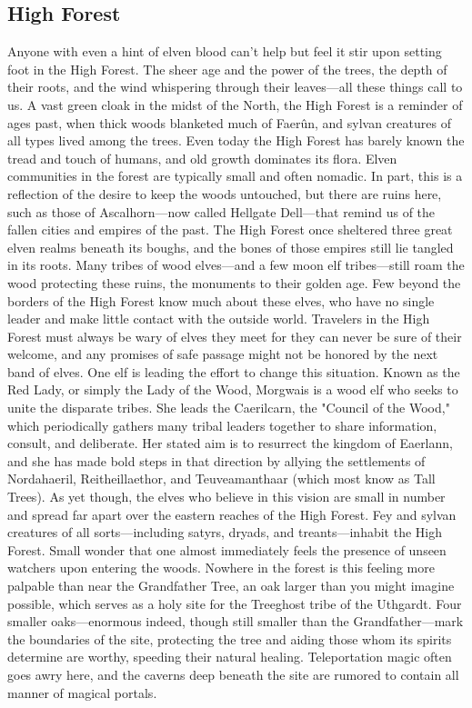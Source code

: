 \documentclass[10pt,a4paper,twoside,twocolumn,openany,bg=print,nodeprecatedcode]{dndbook}
\begin{document}
\subsection{High Forest}
Anyone with even a hint of elven blood can't help but feel it stir upon setting foot in the High Forest. The sheer age and the power of the trees, the depth of their roots, and the wind whispering through their leaves—all these things call to us.
A vast green cloak in the midst of the North, the High Forest is a reminder of ages past, when thick woods blanketed much of Faerûn, and sylvan creatures of all types lived among the trees. Even today the High Forest has barely known the tread and touch of humans, and old growth dominates its flora.
Elven communities in the forest are typically small and often nomadic. In part, this is a reflection of the desire to keep the woods untouched, but there are ruins here, such as those of Ascalhorn—now called Hellgate Dell—that remind us of the fallen cities and empires of the past.
The High Forest once sheltered three great elven realms beneath its boughs, and the bones of those empires still lie tangled in its roots. Many tribes of wood elves—and a few moon elf tribes—still roam the wood protecting these ruins, the monuments to their golden age. Few beyond the borders of the High Forest know much about these elves, who have no single leader and make little contact with the outside world. Travelers in the High Forest must always be wary of elves they meet for they can never be sure of their welcome, and any promises of safe passage might not be honored by the next band of elves.
One elf is leading the effort to change this situation. Known as the Red Lady, or simply the Lady of the Wood, Morgwais is a wood elf who seeks to unite the disparate tribes. She leads the Caerilcarn, the "Council of the Wood," which periodically gathers many tribal leaders together to share information, consult, and deliberate. Her stated aim is to resurrect the kingdom of Eaerlann, and she has made bold steps in that direction by allying the settlements of Nordahaeril, Reitheillaethor, and Teuveamanthaar (which most know as Tall Trees). As yet though, the elves who believe in this vision are small in number and spread far apart over the eastern reaches of the High Forest.
Fey and sylvan creatures of all sorts—including satyrs, dryads, and treants—inhabit the High Forest. Small wonder that one almost immediately feels the presence of unseen watchers upon entering the woods.
Nowhere in the forest is this feeling more palpable than near the Grandfather Tree, an oak larger than you might imagine possible, which serves as a holy site for the Treeghost tribe of the Uthgardt. Four smaller oaks—enormous indeed, though still smaller than the Grandfather—mark the boundaries of the site, protecting the tree and aiding those whom its spirits determine are worthy, speeding their natural healing. Teleportation magic often goes awry here, and the caverns deep beneath the site are rumored to contain all manner of magical portals.
\end{document}
